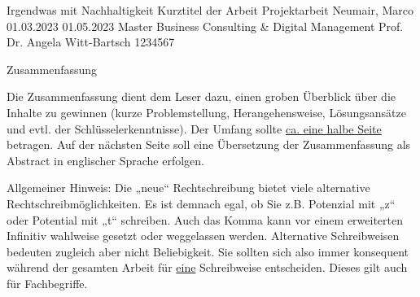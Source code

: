 \documentclass[12pt, oneside]{article}
\begin{document}
\titlespacing{\section}{0pt}{0pt}{0pt}
\titlespacing{\subsection}{0pt}{6pt}{0pt}
\titlespacing{\subsubsection}{0pt}{6pt}{0pt}

  \JMUTitle
      {Irgendwas mit Nachhaltigkeit}                                %
      {Kurztitel der Arbeit}                            %
      {Projektarbeit}       %
      {Neumair, Marco}                              %
      {01.03.2023}                                      %
      {01.05.2023}                                      %
      {Master Business Consulting & Digital Management}           %
      {Prof. Dr. Angela Witt-Bartsch}                       %
      {1234567}                                         %


\newpage
{}

\Zusammenfassung
{Zusammenfassung}
{Die Zusammenfassung dient dem Leser dazu, einen groben Überblick über die Inhalte zu gewinnen (kurze Problemstellung, Herangehensweise, Lösungsansätze und evtl. der Schlüsselerkenntnisse). Der Umfang sollte \underline{ca. eine halbe Seite} betragen. Auf der nächsten Seite soll eine Übersetzung der Zusammenfassung als Abstract in englischer Sprache erfolgen.

Allgemeiner Hinweis: Die „neue“ Rechtschreibung bietet viele alternative Rechtschreibmöglichkeiten. Es ist demnach egal, ob Sie z.B. Potenzial mit „z“ oder Potential mit „t“ schreiben. Auch das Komma kann vor einem erweiterten Infinitiv wahlweise gesetzt oder weggelassen werden. Alternative Schreibweisen bedeuten zugleich aber nicht Beliebigkeit. Sie sollten sich also immer konsequent während der gesamten Arbeit für \underline{eine} Schreibweise entscheiden. Dieses gilt auch für Fachbegriffe.
}
\end{document}
